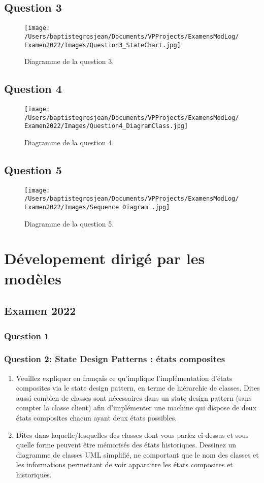 \subsection*{Question 3}
\begin{figure}[H]
	\centering
	\texttt{[image: /Users/baptistegrosjean/Documents/VPProjects/ExamensModLog/Examen2022/Images/Question3\_StateChart.jpg]}
	\caption{Diagramme de la question 3.}
\end{figure}
\subsection*{Question 4}
\begin{figure}[H]
	\centering
	\texttt{[image: /Users/baptistegrosjean/Documents/VPProjects/ExamensModLog/Examen2022/Images/Question4\_DiagramClass.jpg]}
	\caption{Diagramme de la question 4.}
\end{figure}
\subsection*{Question 5}
\begin{figure}[H]
	\centering
	\texttt{[image: /Users/baptistegrosjean/Documents/VPProjects/ExamensModLog/Examen2022/Images/Sequence Diagram .jpg]}
	\caption{Diagramme de la question 5.}
\end{figure}

\newpage
\section{D\'evelopement dirig\'e par les mod\`eles}
\subsection{Examen 2022}
\subsubsection{Question 1}
\subsubsection{Question 2: State Design Patterns : \'etats composites}
\begin{enumerate}
	\item Veuillez expliquer en français ce qu'implique l'implémentation d'états composites via le state design pattern, en terme de hiérarchie de classes. Dites aussi combien de classes sont nécessaires dans un state design pattern (sans compter la classe client) afin d'implémenter une machine qui dispose de deux états composites chacun ayant deux états possibles.
	\item Dites dans laquelle/lesquelles des classes dont vous parlez ci-dessus et sous quelle forme peuvent être mémorisés des états historiques. Dessinez un diagramme de classes UML simplifié, ne comportant que le nom des classes et les informations permettant de voir apparaitre les états composites et historiques.
\end{enumerate}
